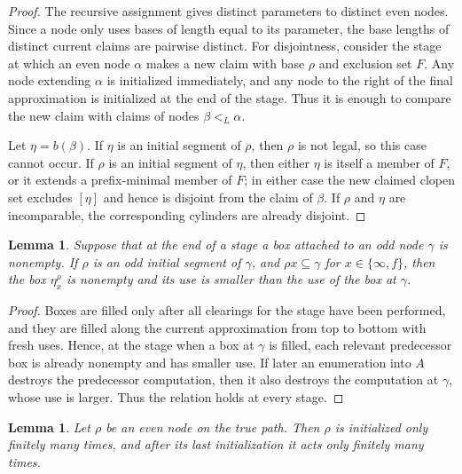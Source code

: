 \documentclass[10pt,a4paper]{amsart}
\newtheorem{lemma}[theorem]{Lemma}
\begin{document}
\begin{proof}
The recursive assignment gives distinct parameters to distinct
even nodes. Since a node only uses bases of length
equal to its parameter, the base lengths of distinct current claims are
pairwise distinct.
For disjointness, consider the stage at which an even node $\alpha$ makes a new
claim with base $\rho$ and exclusion set $F$.  Any node extending $\alpha$ is
initialized immediately, and any node to the right of the final approximation
is initialized at the end of the stage.  Thus it is enough to compare the new
claim with claims of nodes $\beta<_L\alpha$.

Let $\eta=b(\beta)$.  If $\eta$ is an initial segment of $\rho$, then $\rho$ is
not legal, so this case cannot occur.  If $\rho$ is an initial segment of
$\eta$, then either $\eta$ is itself a member of $F$, or it extends a
prefix-minimal member of $F$; in either case the new claimed clopen set excludes
$[\eta]$ and hence is disjoint from the claim of $\beta$.  If $\rho$ and
$\eta$ are incomparable, the corresponding cylinders are already disjoint.
\end{proof}

\begin{lemma}\label{box-nesting-main}
Suppose that at the end of a stage a box attached to an odd node $\gamma$ is
nonempty.  If $\rho$ is an odd initial segment of $\gamma$, and
$\rho x\subseteq\gamma$ for $x\in\{\infty,f\}$, then the box $\eta_x^\rho$ is
nonempty and its use is smaller than the use of the box at $\gamma$.
\end{lemma}

\begin{proof}
Boxes are filled only after all clearings for the stage have been performed,
and they are filled along the current approximation from top to bottom with
fresh uses.  Hence, at the stage when a box at $\gamma$ is filled, each relevant
predecessor box is already nonempty and has smaller use.  If later an
enumeration into $A$ destroys the predecessor computation, then it also destroys
the computation at $\gamma$, whose use is larger.  Thus the relation holds at
every stage.
\end{proof}

\begin{lemma}\label{finite-injury-main}
Let $\rho$ be an even node on the true path. Then $\rho$ is initialized only finitely many times, and after its last initialization it acts only finitely many
times.
\end{lemma}
\end{document}
